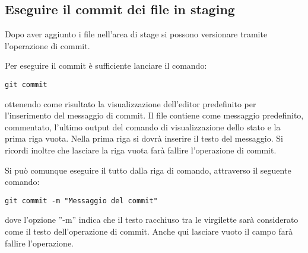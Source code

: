 \subsection{Eseguire il commit dei file in staging}
Dopo aver aggiunto i file nell'area di stage si possono versionare tramite l'operazione di commit.

Per eseguire il commit è sufficiente lanciare il comando:

\begin{center}
\texttt{git commit}
\end{center}

ottenendo come risultato la visualizzazione dell'editor predefinito per l'inserimento del messaggio di commit. Il file contiene come messaggio predefinito, commentato, l'ultimo output del comando di visualizzazione dello stato e la prima riga vuota. Nella prima riga si dovrà inserire il testo del messaggio. Si ricordi inoltre che lasciare la riga vuota farà fallire l'operazione di commit.

Si può comunque eseguire il tutto dalla riga di comando, attraverso il seguente comando:

\begin{center}
\texttt{git commit -m "Messaggio del commit"}
\end{center}

dove l'opzione ''-m'' indica che il testo racchiuso tra le virgilette sarà considerato come il testo dell'operazione di commit. Anche qui lasciare vuoto il campo farà fallire l'operazione.